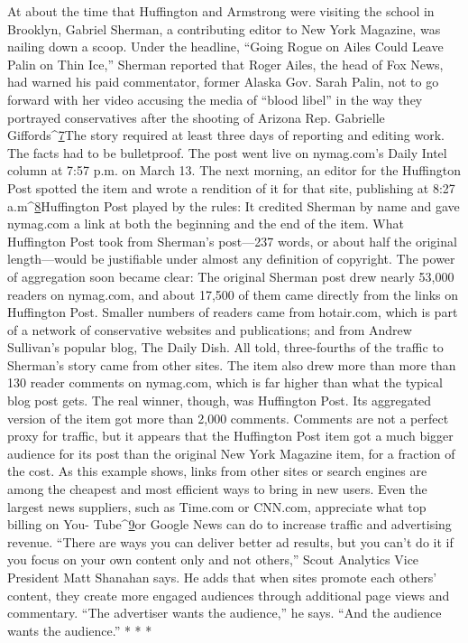 At about the time that Huffington and Armstrong were visiting the school
in Brooklyn, Gabriel Sherman, a contributing editor to New York Magazine,
was nailing down a scoop. Under the headline, ``Going Rogue on Ailes Could
Leave Palin on Thin Ice,'' Sherman reported that Roger Ailes, the head of Fox
News, had warned his paid commentator, former Alaska Gov. Sarah Palin, not to
go forward with her video accusing the media of ``blood libel'' in the way they
portrayed conservatives after the shooting of Arizona Rep. Gabrielle Giffords^{\href{#endnotes-chapter-6}{7}}The story required at least three days of reporting and editing work. The facts
had to be bulletproof. The post went live on nymag.com's Daily Intel column at
7:57 p.m. on March 13.
The next morning, an editor for the Huffington Post spotted the item and wrote
a rendition of it for that site, publishing at 8:27 a.m^{\href{#endnotes-chapter-6}{8}}Huffington Post played by
the rules: It credited Sherman by name and gave nymag.com a link at both the
beginning and the end of the item. What Huffington Post took from Sherman's
post—237 words, or about half the original length—would be justifiable under
almost any definition of copyright.
The power of aggregation soon became clear: The original Sherman post
drew nearly 53,000 readers on nymag.com, and about 17,500 of them came directly
from the links on Huffington Post. Smaller numbers of readers came from hotair.com, which is part of a network of conservative websites and publications;
and from Andrew Sullivan's popular blog, The Daily Dish. All told, three-fourths
of the traffic to Sherman's story came from other sites. The item also drew more
than more than 130 reader comments on nymag.com, which is far higher than
what the typical blog post gets.
The real winner, though, was Huffington Post. Its aggregated version of the
item got more than 2,000 comments. Comments are not a perfect proxy for
traffic, but it appears that the Huffington Post item got a much bigger audience
for its post than the original New York Magazine item, for a fraction of the cost.
As this example shows, links from other sites or search engines are among the
cheapest and most efficient ways to bring in new users. Even the largest news
suppliers, such as Time.com or CNN.com, appreciate what top billing on You-
Tube^{\href{#endnotes-chapter-6}{9}}or Google News can do to increase traffic and advertising revenue. ``There
are ways you can deliver better ad results, but you can't do it if you focus on your
own content only and not others,'' Scout Analytics Vice President Matt Shanahan
says. He adds that when sites promote each others' content, they create more engaged
audiences through additional page views and commentary. ``The advertiser
wants the audience,'' he says. ``And the audience wants the audience.''
* * *

